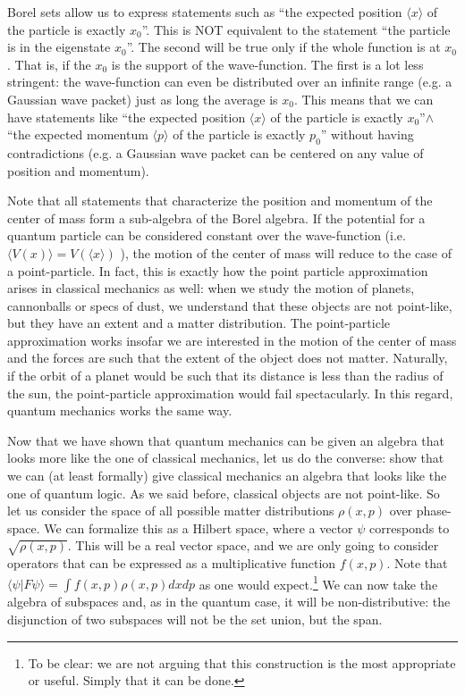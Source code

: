 \documentclass[10pt,twocolumn, nofootinbib]{revtex4-1}
\begin{document}
Borel sets allow us to express statements such as ``the expected position $\langle x \rangle$ of the particle is exactly $x_0$''. This is NOT equivalent to the statement ``the particle is in the eigenstate $x_0$''. The second will be true only if the whole function is at $x_0$. That is, if the $x_0$ is the support of the wave-function. The first is a lot less stringent: the wave-function can even be distributed over an infinite range (e.g. a Gaussian wave packet) just as long the average is $x_0$. This means that we can have statements like ``the expected position $\langle x \rangle$ of the particle is exactly $x_0$''$\wedge$ ``the expected momentum $\langle p \rangle$ of the particle is exactly $p_0$'' without having contradictions (e.g. a Gaussian wave packet can be centered on any value of position and momentum).

Note that all statements that characterize the position and momentum of the center of mass form a sub-algebra of the Borel algebra. If the potential for a quantum particle can be considered constant over the wave-function (i.e. $\langle V(x) \rangle = V(\langle x \rangle)$ ), the motion of the center of mass will reduce to the case of a point-particle. In fact, this is exactly how the point particle approximation arises in classical mechanics as well: when we study the motion of planets, cannonballs or specs of dust, we understand that these objects are not point-like, but they have an extent and a matter distribution. The point-particle approximation works insofar we are interested in the motion of the center of mass and the forces are such that the extent of the object does not matter. Naturally, if the orbit of a planet would be such that its distance is less than the radius of the sun, the point-particle approximation would fail spectacularly. In this regard, quantum mechanics works the same way.

Now that we have shown that quantum mechanics can be given an algebra that looks more like the one of classical mechanics, let us do the converse: show that we can (at least formally) give classical mechanics an algebra that looks like the one of quantum logic. As we said before, classical objects are not point-like. So let us consider the space of all possible matter distributions $\rho(x,p)$ over phase-space. We can formalize this as a Hilbert space, where a vector $\psi$ corresponds to $\sqrt{\rho(x,p)}$. This will be a real vector space, and we are only going to consider operators that can be expressed as a multiplicative function $f(x,p)$. Note that $\langle \psi | F \psi \rangle = \int f(x,p) \rho(x,p) dx dp$ as one would expect.\footnote{To be clear: we are not arguing that this construction is the most appropriate or useful. Simply that it can be done.}  We can now take the algebra of subspaces and, as in the quantum case, it will be non-distributive: the disjunction of two subspaces will not be the set union, but the span.
\end{document}
